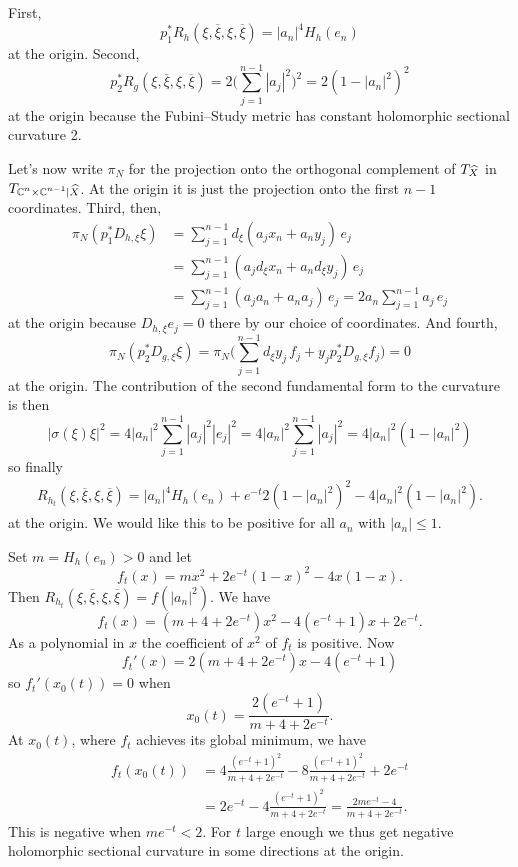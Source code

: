 \documentclass[10pt,a4paper]{amsart}
\newcommand{\kk}[1]{\mathbb{#1}}
\def\ov#1{\overline{#1}}
\def\hsc{holomorphic sectional curvature}
\def\bl#1{\widehat{#1}}
\def\blX{\bl{X}}
\begin{document}
First,
$$
p_1^*R_h(\xi, \ov\xi, \xi, \ov\xi)
= |a_n|^4 H_h(e_n)
$$
at the origin. Second,
$$
p_2^*R_g(\xi, \ov\xi, \xi, \ov\xi)
= 2 \biggl(\sum_{j=1}^{n-1} |a_j|^2\biggr)^2
= 2(1 - |a_n|^2)^2
$$
at the origin
because the Fubini--Study metric has constant \hsc{} 2.

Let's now write $\pi_N$ for the projection onto the orthogonal complement of
$T_{\smash{\blX}}$ in $T_{\smash{\kk C^n \times \kk C^{n-1}|\blX}}$.
At the origin it is just the projection onto the first $n-1$ coordinates.
Third, then,
\begin{align*}
\pi_N(p_1^*D_{h,\xi} \xi)
&= \sum_{j=1}^{n-1} d_{\xi}(a_j x_n + a_n y_j) \, e_j
\\
&= \sum_{j=1}^{n-1} (a_j d_{\xi}x_n + a_n d_{\xi} y_j) \, e_j
\\
&= \sum_{j=1}^{n-1} (a_j a_n + a_n a_j ) \, e_j
= 2 a_n \sum_{j=1}^{n-1} a_j \, e_j
\end{align*}
at the origin
because $D_{h,\xi} e_j = 0$ there by our choice of coordinates.
And fourth,
$$
\pi_N(p_2^*D_{g,\xi} \xi)
= \pi_N \biggl( \sum_{j=1}^{n-1} d_\xi y_j \, f_j + y_j p_2^*D_{g,\xi} f_j \biggr) = 0
$$
at the origin.
The contribution of the second fundamental form to the curvature is then
$$
|\sigma(\xi)\xi|^2
= 4 |a_n|^2 \sum_{j=1}^{n-1} |a_j|^2 |e_j|^2
= 4 |a_n|^2 \sum_{j=1}^{n-1} |a_j|^2
= 4 |a_n|^2(1 - |a_n|^2)
$$
so finally
\begin{align*}
R_{h_t}(\xi, \ov\xi, \xi, \ov\xi)
= |a_n|^4 H_h(e_n)
+ e^{-t} 2(1 - |a_n|^2)^2
- 4 |a_n|^2(1 - |a_n|^2).
\end{align*}
at the origin.
We would like this to be positive for all $a_n$ with $|a_n| \leq 1$.

Set $m = H_h(e_n) > 0$ and let
$$
f_t(x) = m x^2 + 2 e^{-t} (1-x)^2 - 4x(1-x).
$$
Then $R_{h_t}(\xi, \ov\xi, \xi, \ov\xi) = f(|a_n|^2)$.
We have
$$
f_t(x)
= (m + 4 + 2e^{-t})x^2 - 4(e^{-t} + 1)x + 2e^{-t}.
$$
As a polynomial in $x$ the coefficient of $x^2$ of $f_t$ is positive.
Now
$$
f_t'(x)
= 2(m + 4 + 2e^{-t})x - 4(e^{-t} + 1)
$$
so $f_t'(x_0(t)) = 0$ when
$$
x_0(t) = \frac{2(e^{-t} + 1)}{m + 4 + 2e^{-t}}.
$$
At $x_0(t)$, where $f_t$ achieves its global minimum, we have
\begin{align*}
f_t(x_0(t))
&=
4 \frac{(e^{-t} + 1)^2}{m + 4 + 2e^{-t}}
- 8 \frac{(e^{-t} + 1)^2}{m + 4 + 2e^{-t}}
+ 2e^{-t}
\\
&= 2e^{-t}
- 4 \frac{(e^{-t} + 1)^2}{m + 4 + 2e^{-t}}
= \frac{2me^{-t} - 4}{m + 4 + 2e^{-t}}.
\end{align*}
This is negative when $me^{-t} < 2$.
For $t$ large enough we thus get negative \hsc{} in some directions at the origin.





\end{document}
